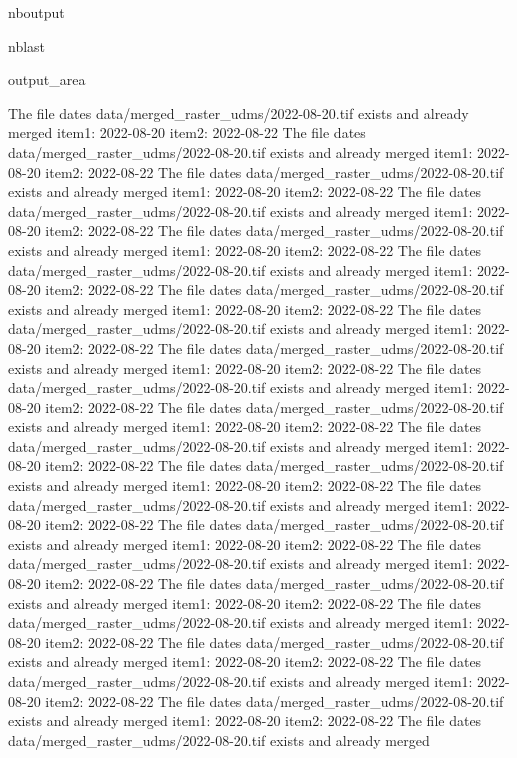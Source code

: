 \documentclass[letterpaper,10pt]{sphinxmanual}
\begin{document}
\begin{sphinxuseclass}{nboutput}
\begin{sphinxuseclass}{nblast}
{\begin{sphinxuseclass}{output_area}
\begin{sphinxuseclass}{}
\begin{sphinxVerbatim}[commandchars=\\\{\}]
The file dates data/merged\_raster\_udms/2022-08-20.tif exists and already merged
item1:  2022-08-20
item2:  2022-08-22
The file dates data/merged\_raster\_udms/2022-08-20.tif exists and already merged
item1:  2022-08-20
item2:  2022-08-22
The file dates data/merged\_raster\_udms/2022-08-20.tif exists and already merged
item1:  2022-08-20
item2:  2022-08-22
The file dates data/merged\_raster\_udms/2022-08-20.tif exists and already merged
item1:  2022-08-20
item2:  2022-08-22
The file dates data/merged\_raster\_udms/2022-08-20.tif exists and already merged
item1:  2022-08-20
item2:  2022-08-22
The file dates data/merged\_raster\_udms/2022-08-20.tif exists and already merged
item1:  2022-08-20
item2:  2022-08-22
The file dates data/merged\_raster\_udms/2022-08-20.tif exists and already merged
item1:  2022-08-20
item2:  2022-08-22
The file dates data/merged\_raster\_udms/2022-08-20.tif exists and already merged
item1:  2022-08-20
item2:  2022-08-22
The file dates data/merged\_raster\_udms/2022-08-20.tif exists and already merged
item1:  2022-08-20
item2:  2022-08-22
The file dates data/merged\_raster\_udms/2022-08-20.tif exists and already merged
item1:  2022-08-20
item2:  2022-08-22
The file dates data/merged\_raster\_udms/2022-08-20.tif exists and already merged
item1:  2022-08-20
item2:  2022-08-22
The file dates data/merged\_raster\_udms/2022-08-20.tif exists and already merged
item1:  2022-08-20
item2:  2022-08-22
The file dates data/merged\_raster\_udms/2022-08-20.tif exists and already merged
item1:  2022-08-20
item2:  2022-08-22
The file dates data/merged\_raster\_udms/2022-08-20.tif exists and already merged
item1:  2022-08-20
item2:  2022-08-22
The file dates data/merged\_raster\_udms/2022-08-20.tif exists and already merged
item1:  2022-08-20
item2:  2022-08-22
The file dates data/merged\_raster\_udms/2022-08-20.tif exists and already merged
item1:  2022-08-20
item2:  2022-08-22
The file dates data/merged\_raster\_udms/2022-08-20.tif exists and already merged
item1:  2022-08-20
item2:  2022-08-22
The file dates data/merged\_raster\_udms/2022-08-20.tif exists and already merged
item1:  2022-08-20
item2:  2022-08-22
The file dates data/merged\_raster\_udms/2022-08-20.tif exists and already merged
item1:  2022-08-20
item2:  2022-08-22
The file dates data/merged\_raster\_udms/2022-08-20.tif exists and already merged
item1:  2022-08-20
item2:  2022-08-22
The file dates data/merged\_raster\_udms/2022-08-20.tif exists and already merged
item1:  2022-08-20
item2:  2022-08-22
The file dates data/merged\_raster\_udms/2022-08-20.tif exists and already merged

\end{sphinxVerbatim}
\end{sphinxuseclass}
\end{sphinxuseclass}}
\end{sphinxuseclass}
\end{sphinxuseclass}
\end{document}
